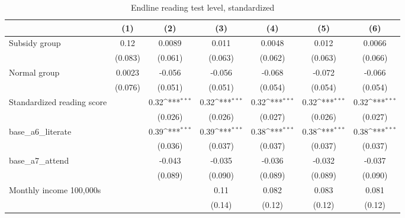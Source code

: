 \begin{table}[htbp]\centering
\def\sym#1{\ifmmode^{#1}\else\(^{#1}\)\fi}
\caption{Endline reading test level, standardized}
\begin{tabular*}{1\hsize}{@{\hskip\tabcolsep\extracolsep\fill}l*{6}{c}}
\toprule
                &\multicolumn{1}{c}{(1)}         &\multicolumn{1}{c}{(2)}         &\multicolumn{1}{c}{(3)}         &\multicolumn{1}{c}{(4)}         &\multicolumn{1}{c}{(5)}         &\multicolumn{1}{c}{(6)}         \\
\midrule
Subsidy group   &     0.12         &   0.0089         &    0.011         &   0.0048         &    0.012         &   0.0066         \\
                &  (0.083)         &  (0.061)         &  (0.063)         &  (0.062)         &  (0.063)         &  (0.066)         \\
Normal group    &   0.0023         &   -0.056         &   -0.056         &   -0.068         &   -0.072         &   -0.066         \\
                &  (0.076)         &  (0.051)         &  (0.051)         &  (0.054)         &  (0.054)         &  (0.054)         \\
Standardized reading score&                  &     0.32\sym{***}&     0.32\sym{***}&     0.32\sym{***}&     0.32\sym{***}&     0.32\sym{***}\\
                &                  &  (0.026)         &  (0.026)         &  (0.027)         &  (0.026)         &  (0.027)         \\
base\_a6\_literate&                  &     0.39\sym{***}&     0.39\sym{***}&     0.38\sym{***}&     0.38\sym{***}&     0.38\sym{***}\\
                &                  &  (0.036)         &  (0.037)         &  (0.037)         &  (0.037)         &  (0.037)         \\
base\_a7\_attend  &                  &   -0.043         &   -0.035         &   -0.036         &   -0.032         &   -0.037         \\
                &                  &  (0.089)         &  (0.090)         &  (0.089)         &  (0.089)         &  (0.090)         \\
Monthly income 100,000s&                  &                  &     0.11         &    0.082         &    0.083         &    0.081         \\
                &                  &                  &   (0.14)         &   (0.12)         &   (0.12)         &   (0.12)         \\

\end{tabular*}
\end{table}
